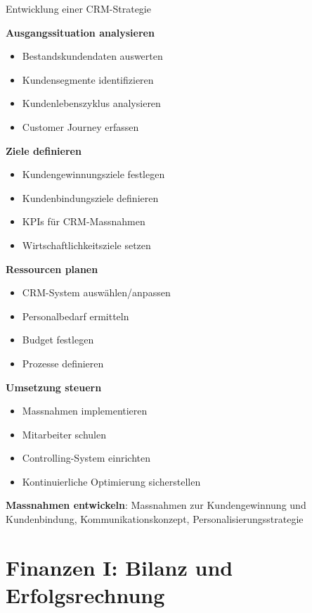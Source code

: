 \begin{KR}{Entwicklung einer CRM-Strategie}

\begin{minipage}{0.5\linewidth}
\textbf{Ausgangssituation analysieren}
\begin{itemize}
    \item Bestandskundendaten auswerten
    \item Kundensegmente identifizieren
    \item Kundenlebenszyklus analysieren
    \item Customer Journey erfassen
\end{itemize}

\textbf{Ziele definieren}
\begin{itemize}
    \item Kundengewinnungsziele festlegen
    \item Kundenbindungsziele definieren
    \item KPIs für CRM-Massnahmen
    \item Wirtschaftlichkeitsziele setzen
\end{itemize}
\end{minipage}
\begin{minipage}{0.5\linewidth}
\textbf{Ressourcen planen}
\begin{itemize}
    \item CRM-System auswählen/anpassen
    \item Personalbedarf ermitteln
    \item Budget festlegen
    \item Prozesse definieren
\end{itemize}

\textbf{Umsetzung steuern}
\begin{itemize}
    \item Massnahmen implementieren
    \item Mitarbeiter schulen
    \item Controlling-System einrichten
    \item Kontinuierliche Optimierung sicherstellen
\end{itemize}
\end{minipage}

\textbf{Massnahmen entwickeln}: Massnahmen zur Kundengewinnung und Kundenbindung, Kommunikationskonzept, Personalisierungsstrategie
\end{KR}



\section{Finanzen I: Bilanz und Erfolgsrechnung}

